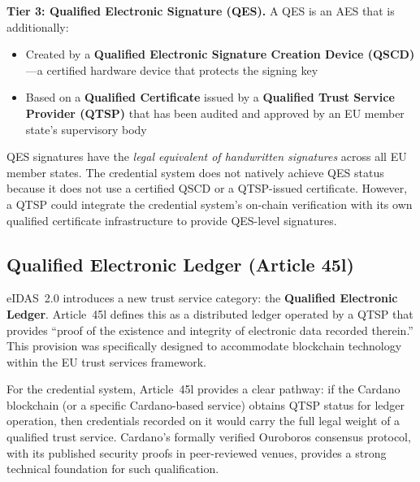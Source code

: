 \textbf{Tier 3: Qualified Electronic Signature (QES).}  A QES is an AES
that is additionally:
\begin{itemize}[nosep]
  \item Created by a \textbf{Qualified Electronic Signature Creation
    Device (QSCD)}---a certified hardware device that protects the
    signing key
  \item Based on a \textbf{Qualified Certificate} issued by a
    \textbf{Qualified Trust Service Provider (QTSP)} that has been
    audited and approved by an EU member state's supervisory body
\end{itemize}

QES signatures have the \emph{legal equivalent of handwritten signatures}
across all EU member states.  The credential system does not natively
achieve QES status because it does not use a certified QSCD or a
QTSP-issued certificate.  However, a QTSP could integrate the credential
system's on-chain verification with its own qualified certificate
infrastructure to provide QES-level signatures.

\subsection{Qualified Electronic Ledger (Article 45l)}

eIDAS~2.0 introduces a new trust service category: the \textbf{Qualified
Electronic Ledger}.  Article~45l defines this as a distributed ledger
operated by a QTSP that provides ``proof of the existence and integrity of
electronic data recorded therein.''  This provision was specifically designed
to accommodate blockchain technology within the EU trust services framework.

For the credential system, Article~45l provides a clear pathway: if the
Cardano blockchain (or a specific Cardano-based service) obtains QTSP
status for ledger operation, then credentials recorded on it would carry
the full legal weight of a qualified trust service.  Cardano's formally
verified Ouroboros consensus protocol, with its published security proofs
in peer-reviewed venues, provides a strong technical foundation for such
qualification.

